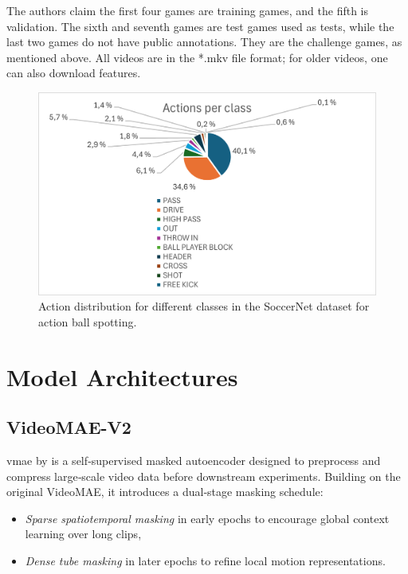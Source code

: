 The authors claim the first four games are training games, and the fifth is validation. The sixth and seventh games are test games used as tests, while the last two games do not have public annotations. They are the challenge games, as mentioned above. All videos are in the *.mkv file format; for older videos, one can also download features. 

\begin{figure}
    \centering
    \includegraphics[width=1\linewidth]{figures/actions_per_class.png}
    \caption{Action distribution for different classes in the SoccerNet dataset for action ball spotting.}
    \label{fig:soccernet_dist}
\end{figure}


\section{Model Architectures}
\label{sec:model_architectures}

\subsection{VideoMAE-V2}
\label{ssec:videomae_v2}

\acrfull{vmae} by \textcite{wang_videomae_2023} is a self‑supervised masked autoencoder designed to preprocess and compress large‑scale video data before downstream experiments. Building on the original VideoMAE, it introduces a dual‑stage masking schedule: 

\begin{itemize}
    \item \emph{Sparse spatiotemporal masking} in early epochs to encourage global context learning over long clips,
    \item \emph{Dense tube masking} in later epochs to refine local motion representations.
\end{itemize}

